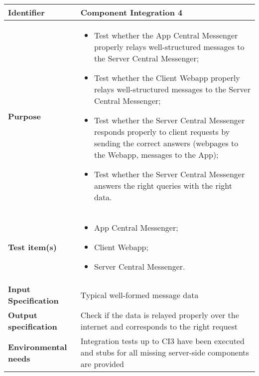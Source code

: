 \begin{center}
\begin{tabular}{lp{}}
\toprule
\textbf{Identifier}		&	Component Integration 4\\
\midrule
\textbf{Purpose}		&	\begin{itemize}
					\item Test whether the App Central Messenger properly relays well-structured messages to the Server Central Messenger;
					\item Test whether the Client Webapp properly relays well-structured messages to the Server Central Messenger;
					\item Test whether the Server Central Messenger responds properly to client requests by sending the correct answers (webpages to the Webapp, messages to the App);
					\item Test whether the Server Central Messenger answers the right queries with the right data.
					\end{itemize}	\\
\textbf{Test item(s)}	&	\begin{itemize}
					\item App Central Messenger;
					\item Client Webapp;
					\item Server Central Messenger.
					\end{itemize}	\\
\textbf{Input Specification}	&	Typical well-formed message data\\
\textbf{Output specification}	&	Check if the data is relayed properly over the internet and corresponds to the right request\\
\textbf{Environmental needs}	&	Integration tests up to CI3 have been executed and stubs for all missing server-side components are provided\\
\bottomrule
\end{tabular}
\end{center}


